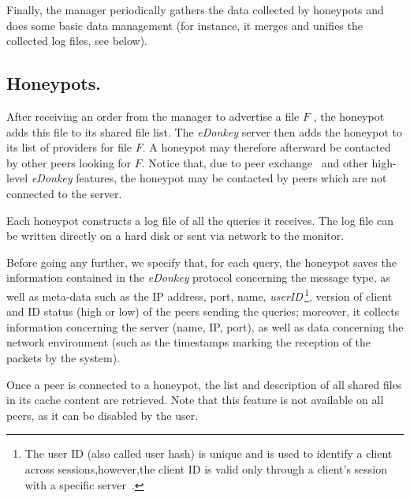 \documentclass[final,
notitlepage,
narroweqnarray,
	inline,
	twoside,
]{ieee}
\begin{document}
Finally, the manager periodically gathers the data collected by honeypots
and does some basic data management
(for instance, it merges and unifies the
collected log files, see below). 

\subsection{Honeypots.} 
After receiving an
order from the manager to advertise a file $F$ ,
the honeypot adds this file to its
shared file list.
The {\em eDonkey} server then adds the honeypot to its list  of 
providers for file $F$. 
A honeypot may therefore afterward be contacted by other peers  looking for $F$.
Notice that, due to peer exchange~\cite{kad} and other high-level {\em eDonkey} features, 
the honeypot may be contacted by peers which are not connected to the server.

Each honeypot constructs a log file of all the queries it receives.
The log file can be written directly on a hard disk or sent via
network to the monitor.

Before going any further, we specify that,
for each query, the honeypot saves the information contained in the {\em eDonkey}
protocol concerning the message type, as well as
meta-data such as the IP address, port, name, {\em userID}\,\footnote{The user ID (also called user hash) is unique and is used to identify a client across sessions,however,the client ID is valid only through a client's session with a specific server~\cite{edonkey}. }, 
version of client and ID status (high or low)
of the peers sending the queries;
moreover, it collects information concerning the server
(name, IP, port),
 as well as data concerning the
network environment (such as the timestamps marking the reception of the
packets by the system).

Once a peer is connected to a honeypot, the list and description of all
shared files in its cache content are retrieved. Note that this feature is not available
on all peers, as it can be disabled by the user.
\end{document}
